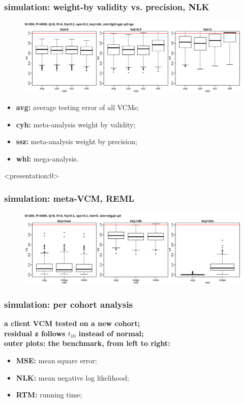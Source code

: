 \documentclass{beamer}
\begin{document}
\begin{frame}%
  \frametitle{simulation: weight-by validity vs. precision, NLK} %
  \begin{figure}
    \centering \includegraphics[width=1.0\linewidth]{img/met_mnq_cyh_nlk}
  \end{figure}
  \textbf{\color{blue}{inner plot: strategies, from left to right:}}
  \begin{itemize}
  \item \textbf{avg:} average testing error of all VCMs;
  \item \textbf{cyh:} meta-analysis weight by validity;
  \item \textbf{ssz:} meta-analysis weight by precision;
  \item \textbf{whl:} mega-analysis.
  \end{itemize}
\end{frame}
\begin{frame} <presentation:0>%
  \frametitle{simulation: meta-VCM, REML} %
  \begin{figure}
    \centering \includegraphics[width=.95\linewidth]{img/met_hom_stt_gct_ssz}
  \end{figure}
\end{frame}
\begin{frame}\frametitle{simulation: per cohort analysis}
  \textbf{a client VCM tested on a new cohort;} \\
  \textbf{residual z follows $t_{10}$ instead of normal;} \\
  {\color{blue}\textbf{outer plots: the benchmark, from left to right:}}
  \begin{itemize}
  \item \textbf{MSE:} mean square error;
  \item \textbf{NLK:} mean negative log likelihood;
  \item \textbf{RTM:} running time;
  \end{itemize}
\end{frame}
\end{document}

